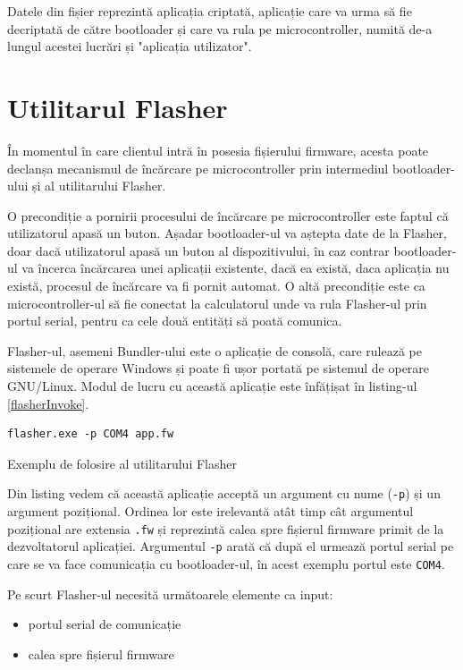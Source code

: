 \documentclass[12pt,a4paper,titlepage]{report}
\begin{document}
Datele din fișier reprezintă aplicația criptată, aplicație care va urma să fie decriptată de către bootloader și care va rula pe microcontroller, numită de-a lungul acestei lucrări și "aplicația utilizator".

\section{Utilitarul Flasher}
În momentul în care clientul intră în posesia fișierului firmware, acesta poate declanșa mecanismul de încărcare pe microcontroller prin intermediul bootloader-ului și al utilitarului Flasher.

O precondiție a pornirii procesului de încărcare pe microcontroller este faptul că utilizatorul apasă un buton. Așadar bootloader-ul va aștepta date de la Flasher, doar dacă utilizatorul apasă un buton al dispozitivului, în caz contrar bootloader-ul va încerca încărcarea unei aplicații existente, dacă ea există, daca aplicația nu există, procesul de încărcare va fi pornit automat. O altă precondiție este ca microcontroller-ul să fie conectat la calculatorul unde va rula Flasher-ul prin portul serial, pentru ca cele două entități să poată comunica.

Flasher-ul, asemeni Bundler-ului este o aplicație de consolă, care rulează pe sistemele de operare Windows și poate fi ușor portată pe sistemul de operare GNU/Linux. Modul de lucru cu această aplicație este înfățișat în listing-ul \ref{flasherInvoke}.

\begin{listing}[h]
\begin{verbatim}
flasher.exe -p COM4 app.fw
\end{verbatim}

\caption{Exemplu de folosire al utilitarului Flasher}
\label{flasherInvoke}
\end{listing}

Din listing vedem că această aplicație acceptă un argument cu nume (\texttt{-p}) și un argument pozițional. Ordinea lor este irelevantă atât timp cât argumentul pozițional are extensia \texttt{.fw} și reprezintă calea spre fișierul firmware primit de la dezvoltatorul aplicației. Argumentul \texttt{-p} arată că după el urmează portul serial pe care se va face comunicația cu bootloader-ul, în acest exemplu portul este \texttt{COM4}.

Pe scurt Flasher-ul necesită următoarele elemente ca input:
\begin{itemize}
\item portul serial de comunicație
\item calea spre fișierul firmware
\end{itemize}
\end{document}

